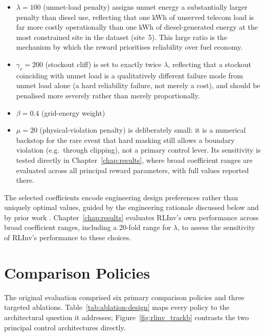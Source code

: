 \begin{itemize}
\item \textbf{$\lambda = 100$} (unmet-load penalty) assigns unmet energy
a substantially larger penalty than diesel use, reflecting that one
kWh of unserved telecom load is far more costly operationally than one
kWh of diesel-generated energy at the most constrained site in the
dataset (site~5). This large ratio is the mechanism by which the reward
prioritises reliability over fuel economy.
\item \textbf{$\gamma_r = 200$} (stockout cliff) is set to exactly twice
$\lambda$, reflecting that a stockout coinciding with unmet load is a
qualitatively different failure mode from unmet load alone (a hard
reliability failure, not merely a cost), and should be penalised more
severely rather than merely proportionally.
\item \textbf{$\beta = 0.4$} (grid-energy weight)
\item \textbf{$\mu = 20$} (physical-violation penalty) is deliberately
small: it is a numerical backstop for the rare event that hard masking
still allows a boundary violation (e.g.\ through clipping), not a primary
control lever. Its sensitivity is tested directly in
Chapter~\ref{chap:results}, where broad coefficient ranges are evaluated
across all principal reward parameters, with full values reported there.
\end{itemize}

The selected coefficients encode engineering design preferences rather
than uniquely optimal values, guided by the engineering rationale
discussed below and by prior work
\citep{hu2024performance}. Chapter~\ref{chap:results} evaluates RLInv's
own performance across broad coefficient ranges, including a 20-fold
range for $\lambda$, to assess the sensitivity of RLInv's performance to
these choices.


\section{Comparison Policies}
\label{sec:comparison_policies}


The original evaluation comprised six primary
comparison policies and three targeted ablations.
Table~\ref{tab:ablation-design} maps every policy to the architectural
question it addresses; Figure~\ref{fig:rlinv_trackb} contrasts the two
principal control architectures directly.

